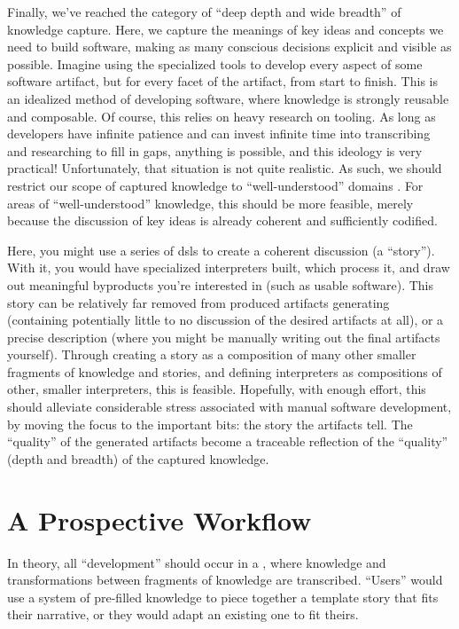 Finally, we've reached the category of ``deep depth and wide breadth'' of
knowledge capture. Here, we capture the meanings of key ideas and concepts we
need to build software, making as many conscious decisions explicit and visible
as possible. Imagine using the specialized tools to develop every aspect of some
software artifact, but for every facet of the artifact, from start to finish.
This is an idealized method of developing software, where knowledge is strongly
reusable and composable. Of course, this relies on heavy research on tooling. As
long as developers have infinite patience and can invest infinite time into
transcribing and researching to fill in gaps, anything is possible, and this
ideology is very practical! Unfortunately, that situation is not quite
realistic. As such, we should restrict our scope of captured knowledge to
``well-understood'' domains \cite{well-understood}. For areas of
``well-understood'' knowledge, this should be more feasible, merely because the
discussion of key ideas is already coherent and sufficiently codified.

Here, you might use a series of \acsp{dsl} to create a coherent discussion (a
``story''). With it, you would have specialized interpreters built, which
process it, and draw out meaningful byproducts you're interested in (such as
usable software). This story can be relatively far removed from produced
artifacts generating (containing potentially little to no discussion of the
desired artifacts at all), or a precise description (where you might be manually
writing out the final artifacts yourself). Through creating a story as a
composition of many other smaller fragments of knowledge and stories, and
defining interpreters as compositions of other, smaller interpreters, this is
feasible. Hopefully, with enough effort, this should alleviate considerable
stress associated with manual software development, by moving the focus to the
important bits: the story the artifacts tell. The ``quality'' of the generated
artifacts become a traceable reflection of the ``quality'' (depth and breadth)
of the captured knowledge.

\section{A Prospective Workflow}
\label{chap:ideology:sec:a_prospective_workflow}

In theory, all ``development'' should occur in a , where knowledge and
transformations between fragments of knowledge are transcribed. ``Users'' would
use a system of pre-filled knowledge to piece together a template story that
fits their narrative, or they would adapt an existing one to fit theirs.

